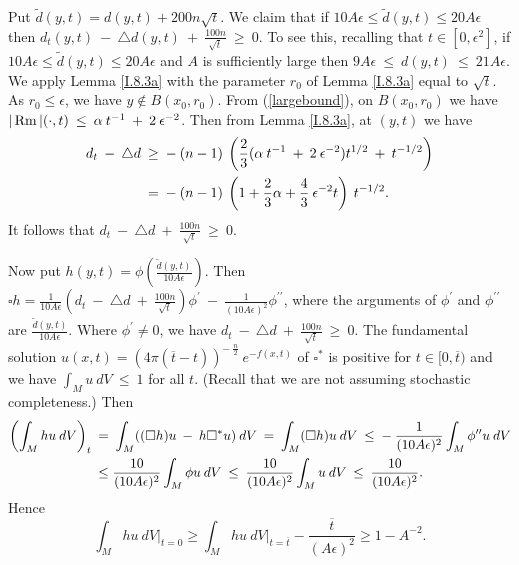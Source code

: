 Put $\widetilde{d}(y,t) = d(y, t) + 200 n \sqrt{t}$. We claim that if
$10A \epsilon \le \widetilde{d}(y,t) \le 20A\epsilon$ then
$d_t(y,t) \: - \: \triangle d(y,t) \: + \: \frac{100n}{\sqrt{t}} \: \ge \: 0$.
To see this, recalling that $t \in [0, \epsilon^2]$,
if $10A \epsilon \le \widetilde{d}(y,t) \le 20A\epsilon$ and $A$ is
sufficiently large then
$9A\epsilon \: \le \: d(y, t) \: \le \:
21A\epsilon$. We apply
Lemma \ref{I.8.3a} with the parameter $r_0$ of
Lemma \ref{I.8.3a} equal to $\sqrt{t}$. As
$r_0 \le \epsilon$, we have $y \notin B(x_0, r_0)$.
From (\ref{largebound}), on $B(x_0, r_0)$ we have
$|\operatorname{Rm}|(\cdot,t) \: \le \: \alpha \: t^{-1} \: + \: 2 \: \epsilon^{-2}$.
Then from Lemma \ref{I.8.3a}, at $(y, t)$ we have
\begin{align}
d_t \: - \: \triangle d \: & \ge \: - \: (n-1) \:
\left( \frac23 (\alpha \: t^{-1} \: + \: 2 \: \epsilon^{-2} ) t^{1/2}
\: + \: t^{-1/2} \right) \\
& = \: - \: (n-1) \:
\left( 1 + \frac23 \alpha + \frac43 \:
\epsilon^{-2} t \right) \: t^{-1/2}. \notag
\end{align}
It follows that
$d_t \: - \: \triangle d \: + \: \frac{100n}{\sqrt{t}} \: \ge \: 0$.

Now put $h(y,t) = \phi \left( \frac{\widetilde{d}(y,t)}{10A\epsilon} \right)$.
Then $\square h = \frac{1}{10A\epsilon} \left(
d_t \: - \: \triangle d \: + \: \frac{100n}{\sqrt{t}} \right) \phi^\prime \: - \:
\frac{1}{(10A\epsilon)^2} \phi^{\prime \prime}$, where the arguments of
$\phi^\prime$ and $\phi^{\prime \prime}$ are
$\frac{\widetilde{d}(y,t)}{10A\epsilon}$. Where
$\phi^\prime \neq 0$,
we have $d_t \: - \: \triangle d \: + \: \frac{100n}{\sqrt{t}} \: \ge \: 0$.
The fundamental solution $u(x,t) = (4\pi(\overline{t}-t))^{- \: \frac{n}{2}} \:
e^{-f(x,t)}$ of $\square^*$ is positive for $t \in [0, \overline{t})$
and we have
$\int_M u \: dV \: \le \: 1$ for all $t$.
(Recall that we are not assuming stochastic completeness.)
Then
\begin{align}
\left( \int_M hu \: dV \right)_t \: & = \: \int_M ((\square h) u \: - \: h
\square^* u) \: dV \:  = \: \int_M (\square h) u \: dV \: \le \: - \:
\frac{1}{(10A\epsilon)^2} \int_M \phi^{\prime \prime} u \: dV \\
& \le \frac{10}{(10A\epsilon)^2} \int_M \phi u \: dV \:
 \le \:
\frac{10}{(10A\epsilon)^2} \int_M u \: dV \: \le \: \frac{10}{(10A\epsilon)^2}. \notag
\end{align}
Hence
\begin{equation} \label{ut}
\int_M hu \: dV \Big|_{t=0} \ge \int_M hu \: dV \Big|_{t=\overline{t}} -
\frac{\overline{t}}{(A\epsilon)^2} \ge 1 - A^{-2}.
\end{equation}


